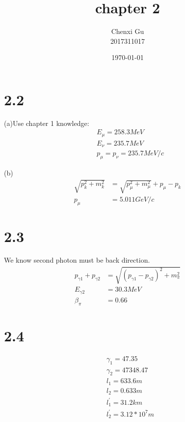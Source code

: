 \documentclass{article}
\begin{document}
\begin{CJK*}{GBK}{song}

\pagestyle{fancy}  
\fancyhead{} %
\renewcommand{\headrulewidth}{0.4pt}  
\renewcommand{\footrulewidth}{0.4pt} 



\title {chapter 2}
\author{Chenxi Gu\\2017311017}

\date{\today}

\maketitle

\section{2.2}
(a)Use chapter 1 knowledge:
\begin{equation}
\begin{aligned}
&E_{\mu}=258.3MeV\\
&E_{\nu}=235.7MeV\\
&p_{\mu}=p_{\nu}=235.7MeV/c
\end{aligned}
\end{equation}

(b)
\begin{equation}
\begin{aligned}
\sqrt{p_k^2+m_k^2}&=\sqrt{p_{\mu}^2+m_{\mu}^2}+p_{\mu}-p_k\\
p_{\mu}&=5.011GeV/c
\end{aligned}
\end{equation}


\section{2.3}
We know second photon must be back direction.
\begin{equation}
\begin{aligned}
p_{\gamma1}+p_{\gamma2}&=\sqrt{(p_{\gamma1}-p_{\gamma2})^2+m_{\pi}^2}\\
E_{\gamma2}&=30.3MeV\\
\beta_{\pi}&=0.66
\end{aligned}
\end{equation}


\section{2.4}
\begin{equation}
\begin{aligned}
&\gamma_1=47.35\\
&\gamma_2=47348.47\\
&l_1=633.6m\\
&l_2=0.633m\\
&l^{'}_1=31.2km\\
&l^{'}_2=3.12*10^7m
\end{aligned}
\end{equation}


\end{CJK*}
\end{document}
